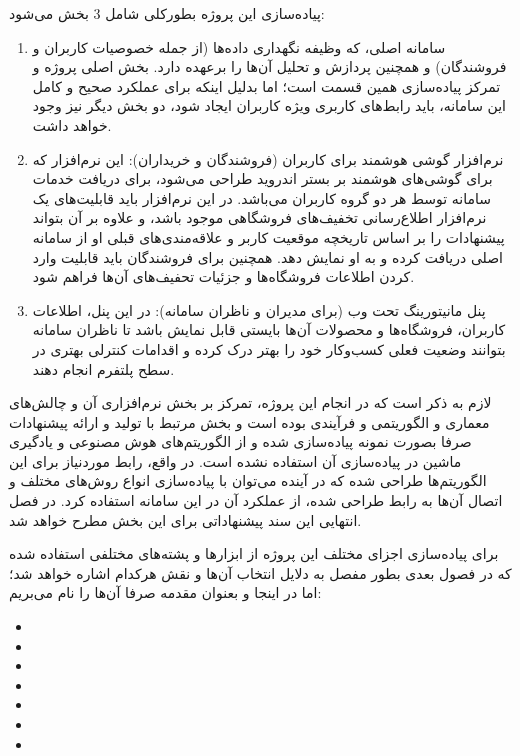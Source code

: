 پیاده‌سازی این پروژه بطورکلی شامل 3 بخش می‌شود:
\begin{enumerate}
	
	\item سامانه اصلی، که وظیفه نگهداری داده‌ها (از جمله خصوصیات کاربران و فروشندگان) و همچنین پردازش و تحلیل آن‌ها را برعهده دارد. بخش اصلی پروژه و تمرکز پیاده‌سازی همین قسمت است؛ اما بدلیل اینکه برای عملکرد صحیح و کامل این سامانه، باید رابط‌های کاربری ویژه کاربران ایجاد شود، دو بخش دیگر نیز وجود خواهد داشت.
	
	\item نرم‌افزار گوشی هوشمند  برای کاربران (فروشندگان و خریداران): این نرم‌افزار که برای گوشی‌های هوشمند بر بستر اندروید  طراحی می‌شود، برای دریافت خدمات سامانه توسط هر دو گروه کاربران می‌باشد. در این نرم‌افزار باید قابلیت‌های یک نرم‌افزار اطلاع‌رسانی تخفیف‌های فروشگاهی موجود باشد، و علاوه بر آن بتواند پیشنهادات را بر اساس تاریخچه موقعیت کاربر و علاقه‌مندی‌های قبلی او از سامانه اصلی دریافت کرده و به او نمایش دهد. همچنین برای فروشندگان باید قابلیت وارد کردن اطلاعات فروشگاه‌ها و جزئیات تحفیف‌های آن‌ها فراهم شود.
	
	\item پنل مانیتورینگ تحت وب (برای مدیران و ناظران سامانه): در این پنل، اطلاعات کاربران،‌ فروشگاه‌ها و محصولات آن‌ها بایستی قابل نمایش باشد تا ناظران سامانه بتوانند وضعیت فعلی کسب‌وکار خود را بهتر درک کرده و اقدامات کنترلی بهتری در سطح پلتفرم انجام دهند.

\end{enumerate}

لازم به ذکر است که در انجام این پروژه، تمرکز بر بخش نرم‌افزاری آن و چالش‌های معماری و الگوریتمی و فرآیندی بوده است و بخش مرتبط با تولید و ارائه پیشنهادات صرفا بصورت نمونه پیاده‌سازی شده و از الگوریتم‌های هوش مصنوعی و یادگیری ماشین در پیاده‌سازی آن استفاده نشده است. در واقع، رابط موردنیاز برای این الگوریتم‌ها طراحی شده که در آینده می‌توان با پیاده‌سازی انواع روش‌های مختلف و اتصال آن‌ها به رابط طراحی شده، از عملکرد آن در این سامانه استفاده کرد. در فصل انتهایی این سند پیشنهاداتی برای این بخش مطرح خواهد شد.
\newpage


برای پیاده‌سازی اجزای مختلف این پروژه از ابزارها و پشته‌های مختلفی استفاده شده که در فصول بعدی بطور مفصل به دلایل انتخاب آن‌ها و نقش هرکدام اشاره خواهد شد؛ اما در اینجا و بعنوان مقدمه صرفا آن‌ها را نام می‌بریم:
\begin{itemize}
	\item {}
	\item {}
	\item {}
	\item {}
	\item {}				
	\item {}
	\item {}
\end{itemize}
